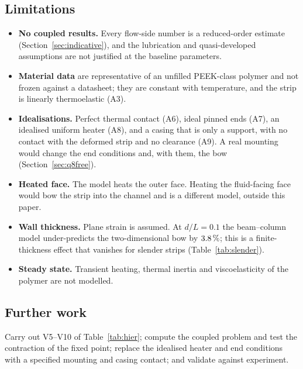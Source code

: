 \subsection*{Limitations}\label{sec:limits}
\begin{itemize}
\item \textbf{No coupled results.} Every flow-side number is a reduced-order estimate (Section~\ref{sec:indicative}),
and the lubrication and quasi-developed assumptions are not justified at the baseline parameters.
\item \textbf{Material data} are representative of an unfilled PEEK-class polymer and not frozen against a
datasheet; they are constant with temperature, and the strip is linearly thermoelastic (A3).
\item \textbf{Idealisations.} Perfect thermal contact (A6), ideal pinned ends (A7), an idealised uniform heater
(A8), and a casing that is only a support, with no contact with the deformed strip and no clearance (A9). A real
mounting would change the end conditions and, with them, the bow (Section~\ref{sec:q8free}).
\item \textbf{Heated face.} The model heats the outer face. Heating the fluid-facing face would bow the strip into the
channel and is a different model, outside this paper.
\item \textbf{Wall thickness.} Plane strain is assumed. At $d/L=0.1$ the beam--column model under-predicts the
two-dimensional bow by $3.8\,\%$; this is a finite-thickness effect that vanishes for slender strips
(Table~\ref{tab:slender}).
\item \textbf{Steady state.} Transient heating, thermal inertia and viscoelasticity of the polymer are not
modelled.
\end{itemize}

\subsection*{Further work}
Carry out V5--V10 of Table~\ref{tab:hier}; compute the coupled problem and test the contraction of the
fixed point; replace the idealised heater and end conditions with a specified mounting and casing contact; and
validate against experiment.

